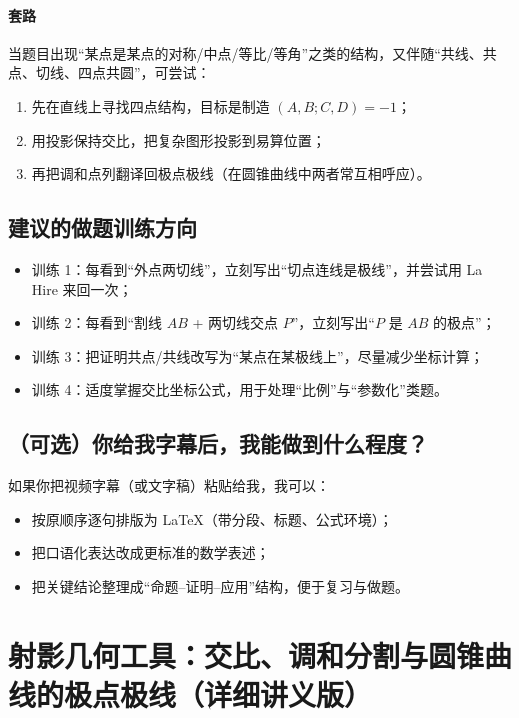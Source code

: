 \documentclass[UTF8]{ctexart}
\begin{document}
	\paragraph{套路}
	当题目出现“某点是某点的对称/中点/等比/等角”之类的结构，又伴随“共线、共点、切线、四点共圆”，可尝试：
	\begin{enumerate}
		\item 先在直线上寻找四点结构，目标是制造 $(A,B;C,D)=-1$；
		\item 用投影保持交比，把复杂图形投影到易算位置；
		\item 再把调和点列翻译回极点极线（在圆锥曲线中两者常互相呼应）。
	\end{enumerate}
	
	\subsection{建议的做题训练方向}
	\begin{itemize}
		\item 训练 1：每看到“外点两切线”，立刻写出“切点连线是极线”，并尝试用 La Hire 来回一次；
		\item 训练 2：每看到“割线 $AB$ + 两切线交点 $P$”，立刻写出“$P$ 是 $AB$ 的极点”；
		\item 训练 3：把证明共点/共线改写为“某点在某极线上”，尽量减少坐标计算；
		\item 训练 4：适度掌握交比坐标公式，用于处理“比例”与“参数化”类题。
	\end{itemize}
	
	\subsection{（可选）你给我字幕后，我能做到什么程度？}
	如果你把视频字幕（或文字稿）粘贴给我，我可以：
	\begin{itemize}
		\item 按原顺序逐句排版为 LaTeX（带分段、标题、公式环境）；
		\item 把口语化表达改成更标准的数学表述；
		\item 把关键结论整理成“命题--证明--应用”结构，便于复习与做题。
	\end{itemize}
	
	
	
	\section{射影几何工具：交比、调和分割与圆锥曲线的极点极线（详细讲义版）}
	
\end{document}
